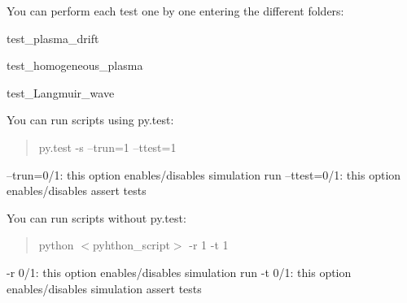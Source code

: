 You can perform each test one by one entering the different folders\+:
\begin{DoxyItemize}
\item test\+\_\+plasma\+\_\+drift
\item test\+\_\+homogeneous\+\_\+plasma
\item test\+\_\+\+Langmuir\+\_\+wave
\end{DoxyItemize}

You can run scripts using py.\+test\+: \begin{quote}
py.\+test -\/s --trun=1 --ttest=1 \end{quote}


--trun=0/1\+: this option enables/disables simulation run --ttest=0/1\+: this option enables/disables assert tests

You can run scripts without py.\+test\+: \begin{quote}
python $<$pyhthon\+\_\+script$>$ -\/r 1 -\/t 1 \end{quote}


-\/r 0/1\+: this option enables/disables simulation run -\/t 0/1\+: this option enables/disables simulation assert tests 